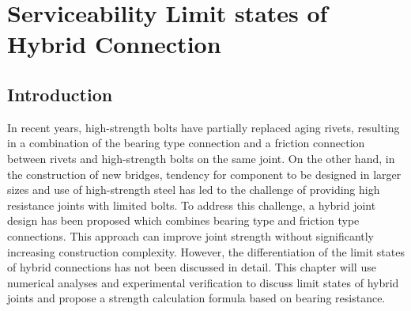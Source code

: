 \chapter{Serviceability Limit states of Hybrid Connection}
\label{ch7}

\begin{spacing}{1.25} %
\minitoc %
\end{spacing} %
\onehalfspacing %



\section{Introduction}

In recent years, high-strength bolts have partially replaced aging rivets, resulting in a combination of the bearing type connection and a friction connection between rivets and high-strength bolts on the same joint. On the other hand, in the construction of new bridges, tendency for component to be designed in larger sizes and use of high-strength steel has led to the challenge of providing high resistance joints with limited bolts. To address this challenge, a hybrid joint design has been proposed which combines bearing type and friction type connections. This approach can improve joint strength without significantly increasing construction complexity. However, the differentiation of the limit states of hybrid connections has not been discussed in detail. This chapter will use numerical analyses and experimental verification to discuss limit states of hybrid joints and propose a strength calculation formula based on bearing resistance.


